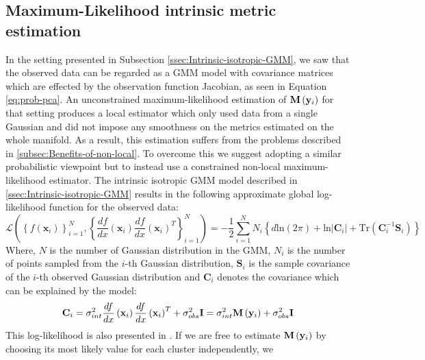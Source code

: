 	\subsection{Maximum-Likelihood intrinsic metric estimation\label{sec:Intrinsic-metric-estimation}}
	
	In the setting presented in Subsection \cref{ssec:Intrinsic-isotropic-GMM},
	we saw that the observed data can be regarded as a \ac{GMM} model
	with covariance matrices which are effected by the observation function
	Jacobian, as seen in Equation \cref{eq:prob-pca}. An unconstrained
	maximum-likelihood estimation of $\mathbf{M}\left({\bf y}_{i}\right)$
	for that setting produces a local estimator which only used data from
	a single Gaussian and did not impose any smoothness on the metrics
	estimated on the whole manifold. As a result, this estimation suffers
	from the problems described in \cref{subsec:Benefits-of-non-local}.
	To overcome this we suggest adopting a similar probabilistic viewpoint
	but to instead use a constrained non-local maximum-likelihood estimator.
	The intrinsic isotropic \ac{GMM} model described in \cref{ssec:Intrinsic-isotropic-GMM}
	results in the following approximate global log-likelihood function
	for the observed data:
	\begin{equation}
	\mathcal{L}\left(\left\{ f\left(\mathbf{x}_{i}\right)\right\} _{i=1}^{N},\left\{ \frac{df}{dx}\left(\mathbf{x}_{i}\right)\frac{df}{dx}\left(\mathbf{x}_{i}\right)^{T}\right\} _{i=1}^{N}\right)=-\frac{1}{2}\sum_{i=1}^{N}N_{i}\left\{ d\text{ln}\left(2\pi\right)+\text{ln}\left|\mathbf{C}_{i}\right|+\text{Tr}\left(\mathbf{C}_{i}^{-1}\mathbf{S}_{i}\right)\right\} 
	\end{equation}
	Where, $N$ is the number of Gaussian distribution in the \ac{GMM},
	$N_{i}$ is the number of points sampled from the $i$-th Gaussian
	distribution, $\mathbf{S}_{i}$ is the sample covariance of the $i$-th
	observed Gaussian distribution and $\mathbf{C}_{i}$ denotes the covariance
	which can be explained by the model:
	\begin{equation}
	\mathbf{C}_{i}=\sigma_{int}^{2}\frac{df}{dx}\left(\mathbf{x}_{i}\right)\frac{df}{dx}\left(\mathbf{x}_{i}\right)^{T}+\sigma_{obs}^{2}\mathbf{I}=\sigma_{int}^{2}\mathbf{M}\left({\bf y}_{i}\right)+\sigma_{obs}^{2}\mathbf{I}
	\end{equation}
	This log-likelihood is also presented in \cite{tipping1999mixtures}.
	If we are free to estimate $\mathbf{M}\left({\bf y}_{i}\right)$ by
	choosing its most likely value for each cluster independently, we
